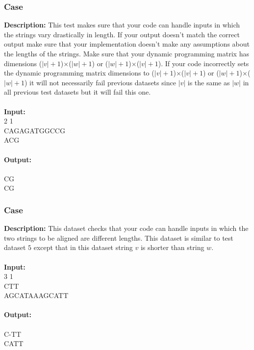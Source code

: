 \documentclass{article}
\newcommand{\code}[1]{{\fontfamily{pcr}\selectfont #1}}
\begin{document}
\subsubsection*{Case }
\hline \vspace{5}
\textbf{Description:} This test makes sure that your code can handle inputs in which the strings vary drastically in length. If your output doesn’t match the correct output make sure that your implementation doesn’t make any assumptions about the lengths of the strings. Make sure that your dynamic programming matrix has dimensions ($|v|+1$)$\times$($|w|+1$) or ($|w|+1$)$\times$($|v|+1$). If your code incorrectly sets the dynamic programming matrix dimensions to ($|v|+1$)$\times$($|v|+1$) or ($|w|+1$)$\times$($|w|+1$) it will not necessarily fail previous datasets since $|v|$ is the same as $|w|$ in all previous test datasets but it will fail this one.\\ \\
\noindent \textbf{Input:}\\
\code{3 2 1\\CAGAGATGGCCG\\ACG}\\ \\
\noindent \textbf{Output:}\\
\code{6\\CG\\CG}

\subsubsection*{Case }
\hline \vspace{5}
\textbf{Description:} This dataset checks that your code can handle inputs in which the two strings to be aligned are different lengths. This dataset is similar to test dataset $5$ except that in this dataset string $v$ is shorter than string $w$.\\ \\
\noindent \textbf{Input:}\\
\code{2 3 1\\CTT\\AGCATAAAGCATT}\\ \\
\noindent \textbf{Output:}\\
\code{5\\C-TT\\CATT}
\end{document}

